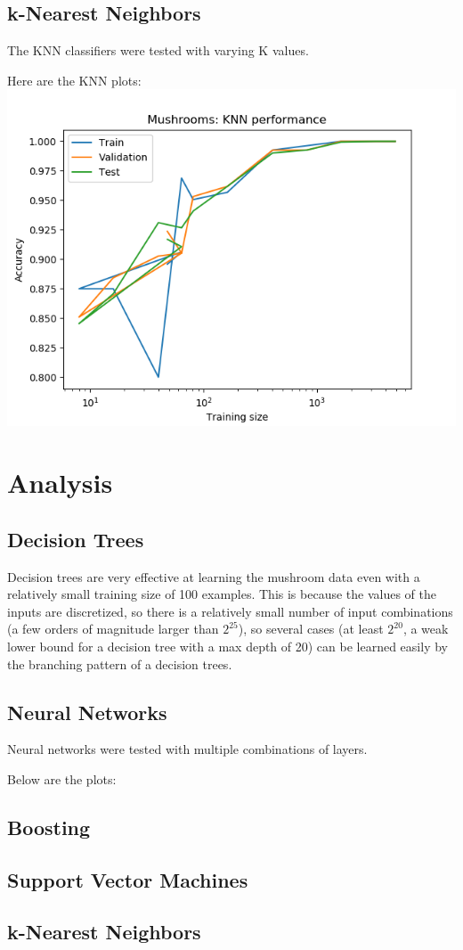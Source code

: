 \documentclass[11pt]{article}
\begin{document}
        \subsection{k-Nearest Neighbors}
        The KNN classifiers were tested with varying K values.

        Here are the KNN plots:
        \includegraphics{mushrooms/mushroom_knn_trainingsize.png}

        \section{Analysis}

        \subsection{Decision Trees}


        Decision trees are very effective at learning the mushroom data even with a relatively
        small training size of 100 examples. This is because the values of the inputs
        are discretized, so there is a relatively small number of input combinations (a few orders
        of magnitude larger than $2^{25}$), so several cases (at least $2^{20}$, a weak lower bound for a decision tree with a max depth of 20) can be learned easily by the branching
        pattern of a decision trees.

        \subsection{Neural Networks}
        Neural networks were tested with multiple combinations of layers.

        Below are the plots:

        \subsection{Boosting}

        
        \subsection{Support Vector Machines}


        \subsection{k-Nearest Neighbors}

        

    
\end{document}
